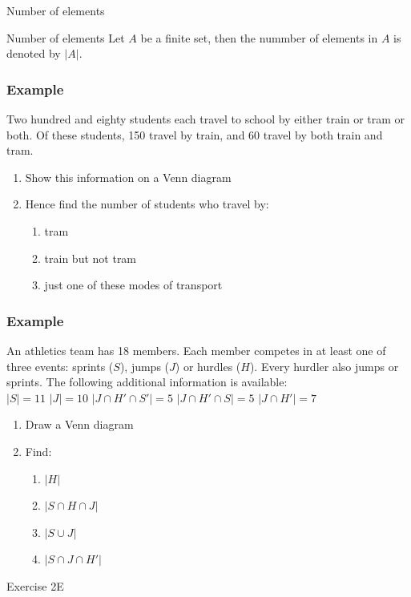 \documentclass[
	11pt, %
]{beamer}
\begin{document}
\begin{frame}{Number of elements}
    \begin{block}{Number of elements}
        Let $A$ be a finite set, then the nummber of elements in $A$ is denoted by $|A|$.
    \end{block}
\end{frame}

\begin{frame}[t]
    \frametitle{Example}
    Two hundred and eighty students each travel to school by either train or tram or both.
Of these students, 150 travel by train, and 60 travel by both train and tram.\\
    \begin{enumerate}
        \item Show this information on a Venn diagram
        \item Hence find the number of students who travel by:
        \begin{enumerate}
            \item tram
            \item train but not tram
            \item just one of these modes of transport
        \end{enumerate}
    \end{enumerate}
\end{frame}

\begin{frame}[t]
    \frametitle{Example}
    An athletics team has 18 members. Each member competes in at least one of three events:
sprints ($S$), jumps ($J$) or hurdles ($H$). Every hurdler also jumps or sprints. The following
additional information is available:\\
\quad $|S| = 11$ \quad $|J| = 10$ \quad $|J \cap H' \cap S'| = 5$ \quad $|J \cap H' \cap S| = 5$ \quad $|J\cap H'| = 7$
\begin{enumerate}
    \item Draw a Venn diagram
    \item Find:
    \begin{enumerate}
        \item $|H|$
        \item $|S\cap H \cap J|$
        \item $|S\cup J|$
        \item $|S \cap J \cap H'|$
    \end{enumerate}
\end{enumerate}
\end{frame}
\begin{frame}
\end{frame}
\begin{frame}
\end{frame}
\begin{frame}{Exercise 2E}
\end{frame}
\end{document}
